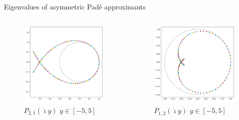 \documentclass{beamer}
\newcommand{\I}{\dot{\imath}}
\begin{document}
\begin{frame}{Eigenvalues of asymmetric Padé approximants}
  \begin{columns}
    \begin{column}{0.5\textwidth}
      \begin{figure}\centering \includegraphics[width=\textwidth]{img/P21_ev} \caption{$P_{2,1}(\I y)$ $y\in[-5,5]$}\end{figure}
    \end{column}
    \begin{column}{0.5\textwidth}
      \begin{figure}\centering \includegraphics[width=\textwidth]{img/P12_ev} \caption{$P_{1,2}(\I y)$ $y\in[-5,5]$}\end{figure}
    \end{column}
  \end{columns}
\end{frame}
\end{document}
